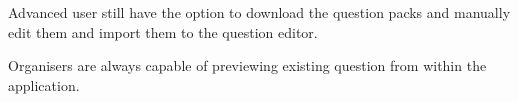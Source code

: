 \begin{section}
\begin{subsection}
        Advanced user still have the option to download the question packs and manually
        edit them and import them to the question editor.
        
        Organisers are always capable of previewing existing question from within the
        application.
    \end{subsection}
    
\end{section}